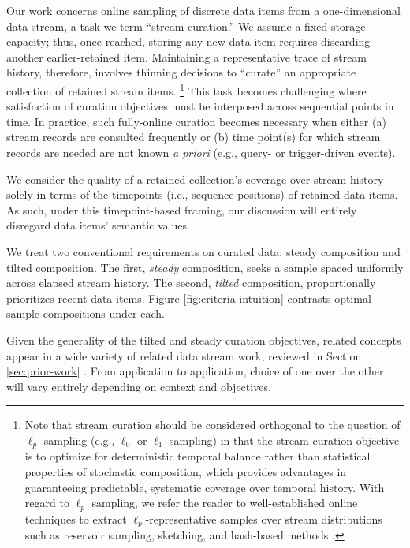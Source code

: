 Our work concerns online sampling of discrete data items from a one-dimensional data stream, a task we term ``stream curation.''
We assume a fixed storage capacity; thus, once reached, storing any new data item requires discarding another earlier-retained item.
Maintaining a representative trace of stream history, therefore, involves thinning decisions to ``curate'' an appropriate collection of retained stream items.%
\footnote{%
Note that stream curation should be considered orthogonal to the question of $\ell_p$ sampling (e.g., $\ell_0$ or $\ell_1$ sampling) in that the stream curation objective is to optimize for deterministic temporal balance rather than statistical properties of stochastic composition, which provides advantages in guaranteeing predictable, systematic coverage over temporal history.
With regard to $\ell_p$ sampling, we refer the reader to well-established online techniques to extract $\ell_p$-representative samples over stream distributions such as reservoir sampling, sketching, and hash-based methods \citep{gaber2005mining,muthukrishnan2005data,cormode2019lp}.
}
This task becomes challenging where satisfaction of curation objectives must be interposed across sequential points in time.
In practice, such fully-online curation becomes necessary when either (a) stream records are consulted frequently or (b) time point(s) for which stream records are needed are not known \textit{a priori} (e.g., query- or trigger-driven events).

We consider the quality of a retained collection's coverage over stream history solely in terms of the timepoints (i.e., sequence positions) of retained data items.
As such, under this timepoint-based framing, our discussion will entirely disregard data items' semantic values.



We treat two conventional requirements on curated data: steady composition and tilted composition.
The first, \textit{{steady}} composition, seeks a sample spaced uniformly across elapsed stream history.
The second, \textit{{tilted}} composition, proportionally prioritizes recent data items.
Figure \ref{fig:criteria-intuition} contrasts optimal sample compositions under each.

Given the generality of the tilted and steady curation objectives, related concepts appear in a wide variety of related data stream work, reviewed in Section \ref{sec:prior-work} \citep{aggarwal2003framework,han2005stream}.
From application to application, choice of one over the other will vary entirely depending on context and objectives.


